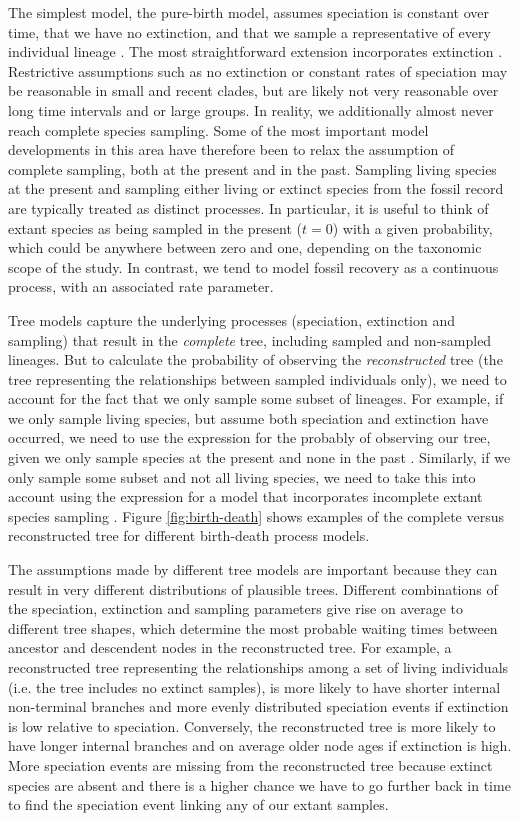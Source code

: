 \documentclass[11pt]{article}
\begin{document}
The simplest model, the pure-birth model, assumes speciation is constant over time, that we have no extinction, and that we sample a representative of every individual lineage \cite{Yule1925}.
The most straightforward extension incorporates  extinction \cite{Kendall1948}.
Restrictive assumptions such as no extinction or constant rates of speciation may be reasonable in small and recent clades, but are likely not very reasonable over long time intervals and or large groups.
In reality, we additionally almost never reach complete species sampling.
Some of the most important model developments in this area have therefore been to relax the assumption of complete sampling, both at the present and in the past.
Sampling living species at the present and sampling either living or extinct species from the fossil record are typically treated as distinct processes.
In particular, it is useful to think of extant species as being sampled in the present ($t=0$) with a given probability, which could be anywhere between zero and one, depending on the taxonomic scope of the study.
In contrast, we tend to model fossil recovery as a continuous process, with an associated rate parameter.  

Tree models capture the underlying processes (speciation, extinction and sampling) that result in the \textit{complete} tree, including sampled and non-sampled lineages. But to calculate the probability of observing the  \textit{reconstructed} tree (the tree representing the relationships between sampled individuals only), we need to account for the fact that we only sample some subset of lineages.
For example, if we only sample living species, but assume both speciation and extinction have occurred, we need to use the expression for the probably of observing our tree, given we only sample species at the present and none in the past \cite{Thompson1975,Gernhard2008, Stadler2009}.  Similarly, if we only sample some subset and not all living species, we need to take this into account using the expression for a model that incorporates incomplete extant species sampling \cite{Yang1997,Stadler2009}.
Figure \ref{fig:birth-death} shows examples of the complete versus reconstructed tree for different birth-death process models.


The assumptions made by different tree models are important because they can result in very different distributions of plausible trees.
Different combinations of the speciation, extinction and sampling parameters give rise on average to different tree shapes, which determine the most probable waiting times between ancestor and descendent nodes 
in the reconstructed tree.
For example, a reconstructed tree representing the relationships among a set of living individuals (i.e. the tree includes no extinct samples),  
 is more likely to have shorter internal non-terminal branches and more evenly distributed speciation events if extinction is low relative to speciation.
Conversely, the reconstructed tree is more likely to have longer internal branches and on average older node ages if extinction is high.
More speciation events are missing from the reconstructed tree because extinct species are absent and there is a higher chance we have to go further back in time to find the speciation event linking any of our extant samples.
\end{document}
